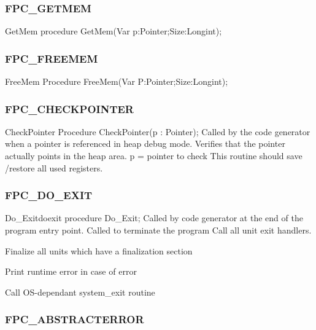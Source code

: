 \documentclass [a4paper,12pt]{article}
\begin{document}
\clearpage
\subsubsection{FPC{\_}GETMEM}
\label{subsubsec:mylabel75}

\begin{procedure}{GetMem}
\Declaration
procedure GetMem(Var p:Pointer;Size:Longint);
\end{procedure}

\subsubsection{FPC{\_}FREEMEM}
\label{subsubsec:mylabel76}

\begin{procedure}{FreeMem}
\Declaration
Procedure FreeMem(Var P:Pointer;Size:Longint);
\end{procedure}

\subsubsection{FPC{\_}CHECKPOINTER}
\label{subsubsec:mylabel77}

\begin{function}{CheckPointer}
\Declaration
Procedure CheckPointer(p : Pointer);
\Description
Called by the code generator when a pointer is referenced in heap debug
mode. Verifies that the pointer actually points in the heap area.
\Parameters
p = pointer to check
\Notes
This routine should save /restore all used registers.
\end{function}

\subsubsection{FPC{\_}DO{\_}EXIT}
\label{subsubsec:mylabel78}

\begin{procedurel}{Do{\_}Exit}{doexit}
\Declaration
procedure Do{\_}Exit;
\Description
Called by code generator at the end of the program entry point.
\Notes
Called to terminate the program
\Algorithm
Call all unit exit handlers. \par
Finalize all units which have a finalization section \par
Print runtime error in case of error\par
Call OS-dependant system{\_}exit routine
\end{procedurel}

\subsubsection{FPC{\_}ABSTRACTERROR}
\label{subsubsec:mylabel79}
\end{document}
